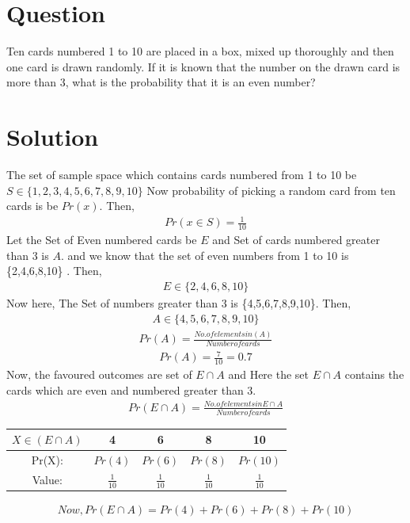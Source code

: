 \documentclass[journal,12pt,twocolumn]{IEEEtran}
\begin{document}
\section*{Question}
Ten cards numbered 1 to 10 are placed in
a box, mixed up thoroughly and then one
card is drawn randomly. If it is known that
the number on the drawn card is more than
3, what is the probability that it is an even
number?
\section*{Solution}
The set of sample space which contains cards numbered from 1 to 10 be $S \in \{1,2,3,4,5,6,7,8,9,10\}$
Now probability of picking a random card from ten cards is be $Pr(x)$. Then,
\begin{align}
Pr(x\in S )=\frac{1}{10}
\end{align}
Let the Set of Even numbered cards be $E$ and Set of cards numbered greater than 3 is $A$.
and we know that the set of even numbers from 1 to 10 is \{2,4,6,8,10\} . Then,
\begin{align}
E \in \{2,4,6,8,10\}    
\end{align}
Now here, The Set of numbers greater than 3 
is \{4,5,6,7,8,9,10\}. Then,
\begin{align}
    A \in \{4,5,6,7,8,9,10\}
\end{align}
\begin{align}
    Pr(A)=\frac{No. of elements in (A)}{Number of cards}
\end{align}
\begin{align}
\label{eq1}
    Pr(A)=\frac{7}{10}=0.7
\end{align}
Now, the favoured outcomes are set of $E \cap A$ and 
Here the set $E \cap A$ contains the cards which are even and numbered greater than 3.
\begin{align}
    Pr(E \cap A)=\frac{No. of elements in E\cap A}{Number of cards}
\end{align}
\begin{tabular}{|c|c|c|c|c|}
    \hline
    $X \in (E\cap A)$ &  4 & 6 & 8 & 10\\
    \hline
    Pr(X): & $Pr(4)$& $Pr(6)$& $Pr(8)$ & $Pr(10)$ \\
    \hline
    Value: & $\frac{1}{10}$  & $\frac{1}{10}$ &$\frac{1}{10}$ & $\frac{1}{10}$ \\
    \hline
\end{tabular} 
\begin{align}
   Now , Pr(E \cap A) = Pr(4)+Pr(6)+Pr(8)+Pr(10)
\end{align}
\end{document}
